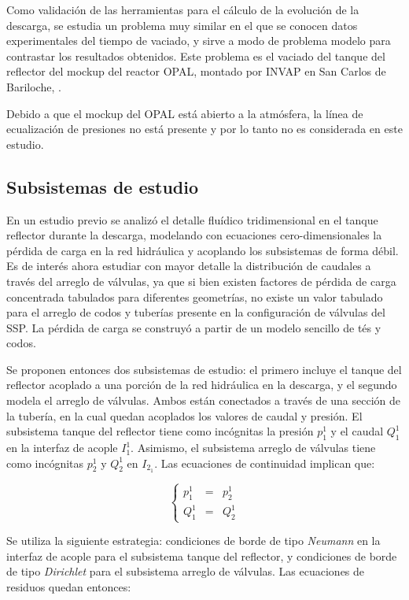 Como validación de las herramientas para el cálculo de la evolución de la descarga,
se estudia un problema muy similar en el que se conocen datos experimentales del tiempo de vaciado,
y sirve a modo de problema modelo para contrastar los resultados obtenidos.
Este problema es el vaciado del tanque del reflector del mockup del reactor OPAL, 
montado por INVAP en San Carlos de Bariloche, \cite{invap-mockup}.

Debido a que el mockup del OPAL está abierto a la atmósfera, la línea de ecualización de presiones no está presente y
por lo tanto no es considerada en este estudio.

\subsection*{Subsistemas de estudio}

En un estudio previo \cite{rechiman-paper} se analizó el detalle fluídico tridimensional en el tanque reflector durante la descarga,
modelando con ecuaciones cero-dimensionales la pérdida de carga en la red hidráulica 
y acoplando los subsistemas de forma débil.
Es de interés ahora estudiar con mayor detalle la distribución de caudales a través del arreglo de válvulas,
ya que si bien existen factores de pérdida de carga concentrada tabulados para diferentes geometrías,
no existe un valor tabulado para el arreglo de codos y tuberías presente en la configuración de válvulas del SSP.
La pérdida de carga se construyó a partir de un modelo sencillo de tés y codos.

Se proponen entonces dos subsistemas de estudio:
el primero incluye el tanque del reflector acoplado a una porción de la red hidráulica en la descarga,
y el segundo modela el arreglo de válvulas.
Ambos están conectados a través de una sección de la tubería,
en la cual quedan acoplados los valores de caudal y presión.
El subsistema tanque del reflector tiene como incógnitas la presión $p_1^1$ y el caudal $Q_1^1$ en la interfaz de acople $I_1^1$.
Asimismo, el subsistema arreglo de válvulas tiene como incógnitas $p_2^1$ y $Q_2^1$ en $I_{2_1}$.
Las ecuaciones de continuidad implican que:

\begin{equation}
\left\{ \begin{array}{rcl}
p_1^1 &=& p_2^1 \\
Q_1^1 &=& Q_2^1
\end{array}
\right.
\end{equation}

Se utiliza la siguiente estrategia:
condiciones de borde de tipo \textit{Neumann} en la interfaz de acople para el subsistema tanque del reflector,
y condiciones de borde de tipo \textit{Dirichlet} para el subsistema arreglo de válvulas.
Las ecuaciones de residuos quedan entonces:


